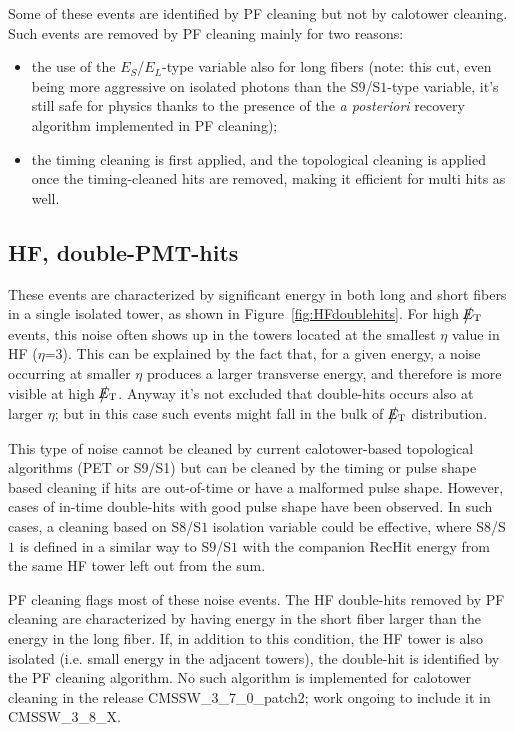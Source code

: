 Some of these events are identified by PF cleaning but not by calotower cleaning.
Such events are removed by PF cleaning mainly for two reasons:
\begin{itemize}
\item the use of the $E_S$/$E_L$-type variable also for long fibers (note: this cut, even being more aggressive on isolated photons 
than the S$9$/S$1$-type variable, it's still safe for physics thanks to the presence of the {\it a posteriori} recovery algorithm
implemented in PF cleaning);
\item the timing cleaning is first applied, and the topological cleaning is applied once 
the timing-cleaned hits are removed, making it efficient for multi hits as well.
\end{itemize}

\subsection{HF, double-PMT-hits}
These events are characterized by significant energy in both long and short fibers in a single
isolated tower, as shown in Figure~\ref{fig:HFdoublehits}. For high $\big\slash\hspace{-1.6ex}{E_\text{T}}$ events, 
this noise often shows up in the towers located at the smallest $\eta$ 
value in HF ($\eta$=3). This can be explained by the fact that, for a given energy, 
a noise occurring at smaller $\eta$ produces a larger transverse energy, and therefore is more visible at high $\big\slash\hspace{-1.6ex}{E_\text{T}}$.
Anyway it's not excluded that double-hits occurs also at larger $\eta$; but in this case such events might 
fall in the bulk of $\big\slash\hspace{-1.6ex}{E_\text{T}}$ distribution.

This type of noise cannot be cleaned by current calotower-based topological algorithms (PET or S9/S1) but can
be cleaned by the timing or pulse shape based cleaning if hits are out-of-time or have a malformed pulse shape.
However, cases of in-time double-hits with good pulse shape have been observed. In such cases, a cleaning based on
S$8$/S$1$ isolation variable could be effective, where S$8$/S$1$ is defined in a similar way to S$9$/S$1$
with the companion RecHit energy from the same HF tower left out from the sum. 

PF cleaning flags most of these noise events. 
The HF double-hits removed by PF cleaning are characterized by having 
energy in the short fiber larger than the energy in the long fiber. 
If, in addition to this condition, the HF tower is also isolated 
(i.e. small energy in the adjacent towers), the double-hit is identified by the PF cleaning algorithm.
No such algorithm is implemented for calotower cleaning in the release CMSSW\_3\_7\_0\_patch2; 
work ongoing to include it in CMSSW\_3\_8\_X.

